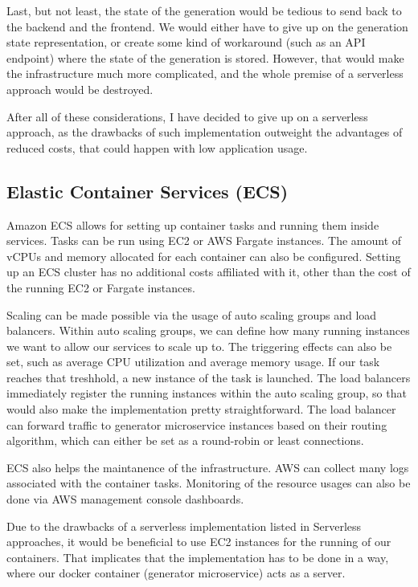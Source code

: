 		Last, but not least, the state of the generation would be tedious to send back to the backend and the frontend. 
		We would either have to give up on the
		generation state representation, or create some kind of workaround (such as an API endpoint) where the state of the generation is
		stored. However, that would make the infrastructure much more complicated, and the whole premise of a serverless approach would 
		be destroyed.

		After all of these considerations, I have decided to give up on a serverless approach, as the drawbacks of such implementation
		outweight the advantages of reduced costs, that could happen with low application usage.
		

	\subsection{Elastic Container Services (ECS)}
		Amazon ECS allows for setting up container tasks and running them inside services. Tasks can be run using EC2 or AWS Fargate instances.
		The amount of vCPUs and memory allocated for each container can also be configured.
		Setting up an ECS cluster has no additional costs affiliated with it, other than the cost of the running EC2 or Fargate instances.

		Scaling can be made possible via the usage of auto scaling groups and load balancers. Within auto scaling groups, we can define how many
		running instances we want to allow our services to scale up to. The triggering effects can also be set, such as average CPU utilization and 
		average memory usage. If our task reaches that treshhold, a new instance of the task is launched.  
		The load balancers immediately register the running instances within the auto
		scaling group, so that would also make the implementation pretty straightforward. The load balancer can forward traffic to generator 
		microservice instances based on their routing algorithm, which can either be set as a round-robin or least connections.

		ECS also helps the maintanence of the infrastructure. AWS can collect many logs associated with 
		the container tasks. Monitoring of the resource usages can also be done via AWS management console dashboards.

		Due to the drawbacks of a serverless implementation listed in Serverless approaches, it would be beneficial to use EC2 instances
		for the running of our containers. That implicates that the implementation has to be done in a way, where our docker container (generator
		microservice) acts as a server.

